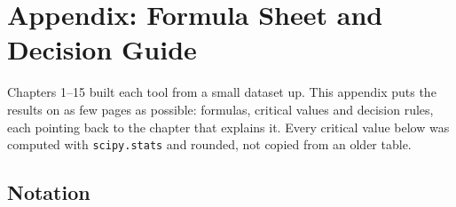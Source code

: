 \chapter{Appendix: Formula Sheet and Decision Guide}
\label{ch:appendix-formulas}

Chapters 1--15 built each tool from a small dataset up. This appendix puts the results on as few pages as possible: formulas, critical values and decision rules, each pointing back to the chapter that explains it. Every critical value below was computed with \texttt{scipy.stats} and rounded, not copied from an older table.

\section{Notation}

